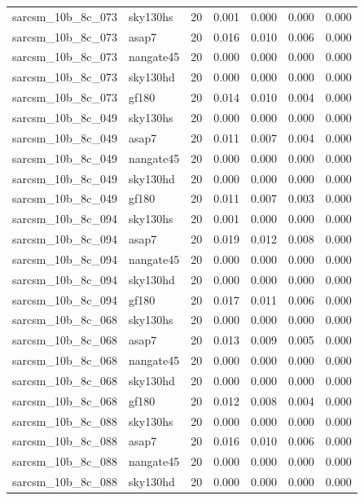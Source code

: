 \begin{tabular}{llrrrrr}
sarcsm\_10b\_8c\_073 & sky130hs & 20 & 0.001 & 0.000 & 0.000 & 0.000 \\
sarcsm\_10b\_8c\_073 & asap7 & 20 & 0.016 & 0.010 & 0.006 & 0.000 \\
sarcsm\_10b\_8c\_073 & nangate45 & 20 & 0.000 & 0.000 & 0.000 & 0.000 \\
sarcsm\_10b\_8c\_073 & sky130hd & 20 & 0.000 & 0.000 & 0.000 & 0.000 \\
sarcsm\_10b\_8c\_073 & gf180 & 20 & 0.014 & 0.010 & 0.004 & 0.000 \\
sarcsm\_10b\_8c\_049 & sky130hs & 20 & 0.000 & 0.000 & 0.000 & 0.000 \\
sarcsm\_10b\_8c\_049 & asap7 & 20 & 0.011 & 0.007 & 0.004 & 0.000 \\
sarcsm\_10b\_8c\_049 & nangate45 & 20 & 0.000 & 0.000 & 0.000 & 0.000 \\
sarcsm\_10b\_8c\_049 & sky130hd & 20 & 0.000 & 0.000 & 0.000 & 0.000 \\
sarcsm\_10b\_8c\_049 & gf180 & 20 & 0.011 & 0.007 & 0.003 & 0.000 \\
sarcsm\_10b\_8c\_094 & sky130hs & 20 & 0.001 & 0.000 & 0.000 & 0.000 \\
sarcsm\_10b\_8c\_094 & asap7 & 20 & 0.019 & 0.012 & 0.008 & 0.000 \\
sarcsm\_10b\_8c\_094 & nangate45 & 20 & 0.000 & 0.000 & 0.000 & 0.000 \\
sarcsm\_10b\_8c\_094 & sky130hd & 20 & 0.000 & 0.000 & 0.000 & 0.000 \\
sarcsm\_10b\_8c\_094 & gf180 & 20 & 0.017 & 0.011 & 0.006 & 0.000 \\
sarcsm\_10b\_8c\_068 & sky130hs & 20 & 0.000 & 0.000 & 0.000 & 0.000 \\
sarcsm\_10b\_8c\_068 & asap7 & 20 & 0.013 & 0.009 & 0.005 & 0.000 \\
sarcsm\_10b\_8c\_068 & nangate45 & 20 & 0.000 & 0.000 & 0.000 & 0.000 \\
sarcsm\_10b\_8c\_068 & sky130hd & 20 & 0.000 & 0.000 & 0.000 & 0.000 \\
sarcsm\_10b\_8c\_068 & gf180 & 20 & 0.012 & 0.008 & 0.004 & 0.000 \\
sarcsm\_10b\_8c\_088 & sky130hs & 20 & 0.000 & 0.000 & 0.000 & 0.000 \\
sarcsm\_10b\_8c\_088 & asap7 & 20 & 0.016 & 0.010 & 0.006 & 0.000 \\
sarcsm\_10b\_8c\_088 & nangate45 & 20 & 0.000 & 0.000 & 0.000 & 0.000 \\
sarcsm\_10b\_8c\_088 & sky130hd & 20 & 0.000 & 0.000 & 0.000 & 0.000 \\

\end{tabular}
